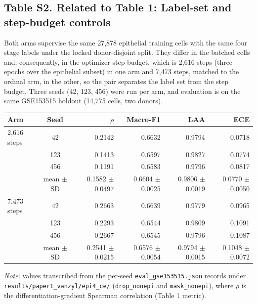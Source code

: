\documentclass[12pt,a4paper]{article}
\begin{document}
\needspace{45mm}
\subsection*{Table S2. Related to Table 1: Label-set and step-budget controls}
\label{tab:S2}

Both arms supervise the same 27{,}878 epithelial training cells with the same four stage labels under the locked donor-disjoint split. They differ in the batched cells and, consequently, in the optimizer-step budget, which is 2{,}616 steps (three epochs over the epithelial subset) in one arm and 7{,}473 steps, matched to the ordinal arm, in the other, so the pair separates the label set from the step budget. Three seeds (42, 123, 456) were run per arm, and evaluation is on the same GSE153515 holdout (14{,}775 cells, two donors).

\medskip
\begingroup
\footnotesize
\setlength{\tabcolsep}{4pt}%
\centering
\begin{tabular}{@{}l c r r r r@{}}
\toprule
Arm & Seed & $\rho$ & Macro-F1 & LAA & ECE\\
\midrule
2{,}616 steps & 42 & 0.2142 & 0.6632 & 0.9794 & 0.0718\\
              & 123 & 0.1413 & 0.6597 & 0.9827 & 0.0774\\
              & 456 & 0.1191 & 0.6583 & 0.9796 & 0.0817\\
              & mean $\pm$ SD & 0.1582 $\pm$ 0.0497 & 0.6604 $\pm$ 0.0025 & 0.9806 $\pm$ 0.0019 & 0.0770 $\pm$ 0.0050\\
\midrule
7{,}473 steps & 42 & 0.2663 & 0.6639 & 0.9779 & 0.0965\\
              & 123 & 0.2293 & 0.6544 & 0.9809 & 0.1091\\
              & 456 & 0.2667 & 0.6545 & 0.9796 & 0.1087\\
              & mean $\pm$ SD & 0.2541 $\pm$ 0.0215 & 0.6576 $\pm$ 0.0054 & 0.9794 $\pm$ 0.0015 & 0.1048 $\pm$ 0.0072\\
\bottomrule
\end{tabular}
\endgroup

\medskip
\noindent\emph{Note:} values transcribed from the per-seed \texttt{eval\_gse153515.json} records under \texttt{results/paper1\_vanzyl/epi4\_ce/} (\texttt{drop\_nonepi} and \texttt{mask\_nonepi}), where $\rho$ is the differentiation-gradient Spearman correlation (Table 1 metric).

\needspace{45mm}
\end{document}
